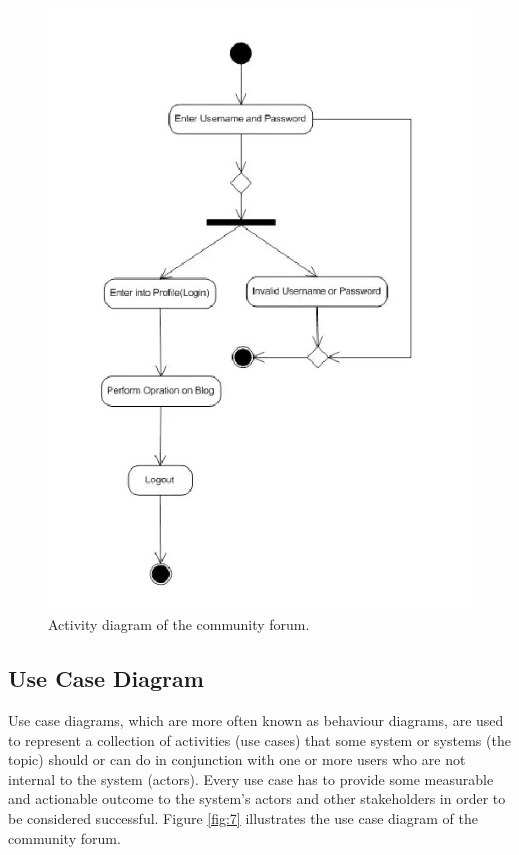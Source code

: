 \begin{figure}
	\centering
	\includegraphics[width=\textwidth]{activity}
	\caption{Activity diagram of the community forum.}
	\label{fig:6}
\end{figure}

\subsection{Use Case Diagram}
Use case diagrams, which are more often known as behaviour diagrams, are used to represent a collection of activities (use cases) that some system or systems (the topic) should or can do in conjunction with one or more users who are not internal to the system (actors). Every use case has to provide some measurable and actionable outcome to the system's actors and other stakeholders in order to be considered successful. Figure \ref{fig:7} illustrates the use case diagram of the community forum.

